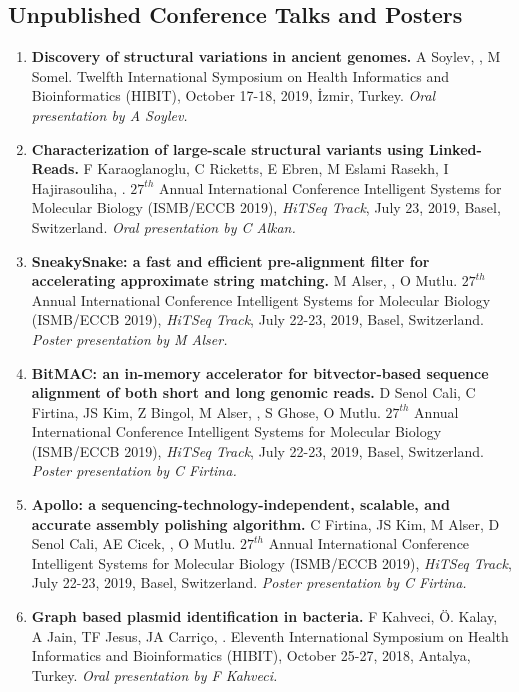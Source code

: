 \subsection{\small \sc  Unpublished Conference Talks and Posters}
\begin{enumerate}

\item
{\bf Discovery of structural variations in ancient genomes.}
A Soylev, \calkan{}, M Somel. 
Twelfth International Symposium on Health Informatics and Bioinformatics (HIBIT), October 17-18, 2019, İzmir, Turkey.
       {\it Oral presentation by A Soylev.}
       
\item
  {\bf Characterization of large-scale structural variants using Linked-Reads.}
  F Karaoglanoglu, C Ricketts, E Ebren, M Eslami Rasekh, I Hajirasouliha, \calkan{}.
$27^{th}$ Annual
International Conference Intelligent Systems for Molecular Biology (ISMB/ECCB 2019), {\em HiTSeq Track},
 July 23, 2019, Basel, Switzerland. {\it Oral presentation by C Alkan.}

\clearpage
\item
  {\bf SneakySnake: a fast and efficient pre-alignment filter for accelerating approximate string matching.}
  M Alser, \calkan{}, O Mutlu.
$27^{th}$ Annual
International Conference Intelligent Systems for Molecular Biology (ISMB/ECCB 2019), {\em HiTSeq Track},
 July 22-23, 2019, Basel, Switzerland. {\it Poster presentation by M Alser.}

\item
   {\bf BitMAC: an in-memory accelerator for bitvector-based sequence alignment of both
short and long genomic reads.}
  D Senol Cali, C Firtina, JS Kim, Z Bingol, M Alser, \calkan{},
S Ghose, O Mutlu.
$27^{th}$ Annual
International Conference Intelligent Systems for Molecular Biology (ISMB/ECCB 2019), {\em HiTSeq Track},
 July 22-23, 2019, Basel, Switzerland. {\it Poster presentation by C Firtina.}

\item
   {\bf Apollo: a sequencing-technology-independent, scalable, and accurate assembly polishing algorithm.}
  C Firtina, JS Kim, M Alser, D Senol Cali, AE Cicek, \calkan{}, O Mutlu.
$27^{th}$ Annual
International Conference Intelligent Systems for Molecular Biology (ISMB/ECCB 2019), {\em HiTSeq Track},
 July 22-23, 2019, Basel, Switzerland. {\it Poster presentation by C Firtina.}


\item
       {\bf Graph based plasmid identification in bacteria.}
       F Kahveci, Ö. Kalay, A Jain, TF Jesus, JA Carriço, \calkan{}.
       Eleventh International Symposium on Health Informatics and Bioinformatics (HIBIT), October 25-27, 2018, Antalya, Turkey.
       {\it Oral presentation by F Kahveci.}
       

\end{enumerate}
